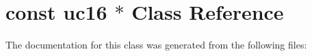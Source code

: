 \hypertarget{classconst_01uc16_01_5}{}\section{const uc16 $\ast$ Class Reference}
\label{classconst_01uc16_01_5}


The documentation for this class was generated from the following files\+: